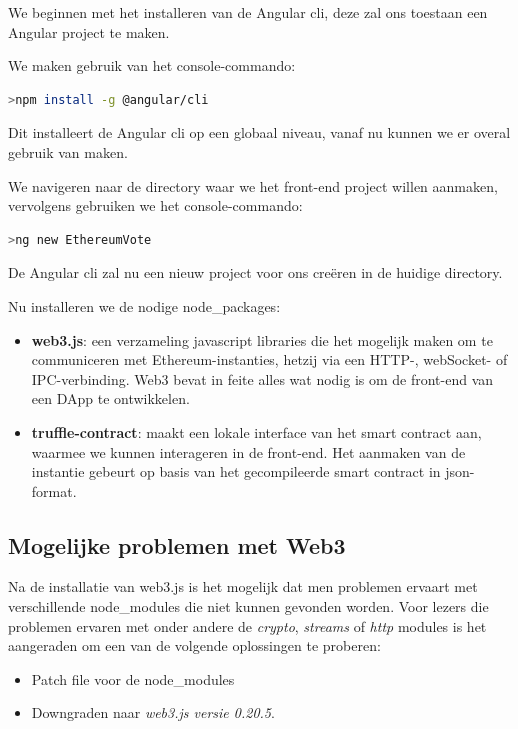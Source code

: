 	We beginnen met het installeren van de Angular cli, deze zal ons toestaan een Angular project te maken.
	
	We maken gebruik van het console-commando:
	\begin{lstlisting}[numbers=none,language=bash]
	>npm install -g @angular/cli
	\end{lstlisting}
	Dit installeert de Angular cli op een globaal niveau, vanaf nu kunnen we er overal gebruik van maken.
	
	We navigeren naar de directory waar we het front-end project willen aanmaken, vervolgens gebruiken we het console-commando:
	\begin{lstlisting}[numbers=none,language=bash]
	>ng new EthereumVote
	\end{lstlisting}
	De Angular cli zal nu een nieuw project voor ons creëren in de huidige directory. 
	
	Nu installeren we de nodige node\_packages:
	\begin{itemize}
		\item \textbf{web3.js}: een verzameling javascript libraries  die het mogelijk maken om te communiceren met Ethereum-instanties, hetzij via  een HTTP-, webSocket- of IPC-verbinding. Web3 bevat in feite alles wat nodig is om de front-end van een DApp te ontwikkelen.
		\item \textbf{truffle-contract}: maakt een lokale interface van het smart contract aan, waarmee we kunnen interageren in de front-end. Het aanmaken van de instantie gebeurt op basis van het gecompileerde smart contract in json-format.
	\end{itemize}

	\subsection{Mogelijke problemen met Web3}
	
	Na de installatie van web3.js is het mogelijk dat men problemen ervaart met verschillende node\_modules die niet kunnen gevonden worden. Voor lezers die problemen ervaren met onder andere de \textit{crypto}, \textit{streams} of \textit{http } modules is het aangeraden om een van de volgende oplossingen te proberen:
	\begin{itemize}
		\item Patch file voor de node\_modules
		\item Downgraden naar \textit{web3.js versie 0.20.5}. 
	\end{itemize}
	
